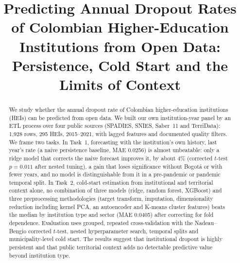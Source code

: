 \documentclass[conference]{IEEEtran}
\begin{document}
\title{Predicting Annual Dropout Rates of Colombian Higher-Education Institutions from Open Data: Persistence, Cold Start and the Limits of Context}

\author{
\and
{}
}

\maketitle

\begin{abstract}
We study whether the annual dropout rate of Colombian higher-education institutions (HEIs) can be predicted from open data. We built our own institution-year panel by an ETL process over four public sources (SPADIES, SNIES, Saber~11 and TerriData): 1,928 rows, 295 HEIs, 2015--2021, with lagged features and documented quality filters. We frame two tasks. In Task~1, forecasting with the institution's own history, last year's rate (a naive persistence baseline, MAE 0.0256) is almost unbeatable: only a ridge model that corrects the naive forecast improves it, by about 4\% (corrected $t$-test $p=0.011$ after nested tuning), a gain that loses significance without Bogot\'a or with fewer years, and no model is distinguishable from it in a pre-pandemic or pandemic temporal split. In Task~2, cold-start estimation from institutional and territorial context alone, no combination of three models (ridge, random forest, XGBoost) and three preprocessing methodologies (target transform, imputation, dimensionality reduction including kernel PCA, an autoencoder and K-means cluster features) beats the median by institution type and sector (MAE 0.0405) after correcting for fold dependence. Evaluation uses grouped, repeated cross-validation with the Nadeau--Bengio corrected $t$-test, nested hyperparameter search, temporal splits and municipality-level cold start. The results suggest that institutional dropout is highly persistent and that public territorial context adds no detectable predictive value beyond institution type.
\end{abstract}
\end{document}
